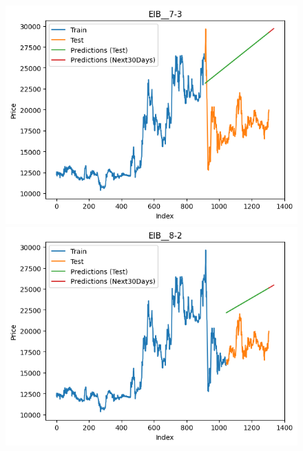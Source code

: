 \begin{figure}[H]
\begin{minipage}{0.15\textwidth}
    \includegraphics[width=1\textwidth]{resources/chapter-5/newdata/result/EIB_LinearRegression_7-3.png}
    \end{minipage}
    \hfill
    \begin{minipage}{0.15\textwidth}
    \centering
    \includegraphics[width=1\textwidth]{resources/chapter-5/newdata/result/EIB_LinearRegression_8-2.png}
    \end{minipage}
    \hfill
        \begin{minipage}{0.15\textwidth}
    \centering

\end{minipage}
\end{figure}
